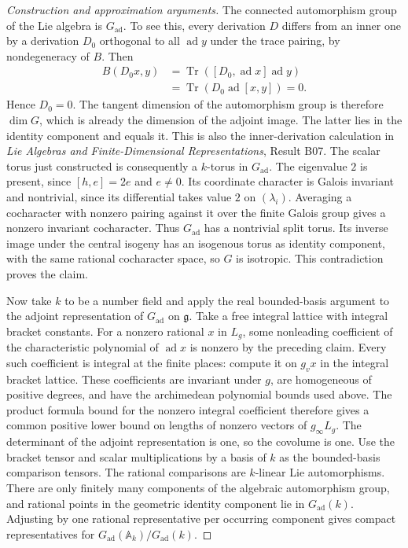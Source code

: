 \documentclass[11pt,a4paper,openany,oneside]{book}
\theoremstyle{resultstyle}
\theoremstyle{definition}
\numberwithin{equation}{chapter}
\begin{document}
\begin{proof}[Construction and approximation arguments]
The connected automorphism group of the Lie
algebra is \(G_{\mathrm{ad}}\). To see this,
every derivation \(D\) differs from an inner one
by a derivation \(D_0\) orthogonal to all
\(\operatorname{ad}y\) under the trace pairing,
by nondegeneracy of \(B\). Then
\[
 \begin{aligned}
 B(D_0x,y)
 &=\operatorname{Tr}([D_0,\operatorname{ad}x]\operatorname{ad}y)\\
 &=\operatorname{Tr}(D_0\operatorname{ad}[x,y])=0 .
 \end{aligned}
\]
Hence \(D_0=0\). The tangent dimension of the
automorphism group is therefore \(\dim G\),
which is already the dimension of the adjoint
image. The latter lies in the identity component
and equals it. This is also the inner-derivation
calculation in \emph{Lie Algebras and Finite-Dimensional
Representations}, Result B07. The scalar torus just constructed
is consequently a \(k\)-torus in \(G_{\mathrm{ad}}\).
The eigenvalue \(2\) is present, since
\([h,e]=2e\) and \(e\ne0\). Its coordinate
character is Galois invariant and nontrivial,
since its differential takes value \(2\) on
\((\lambda_i)\). Averaging a cocharacter with
nonzero pairing against it over the finite
Galois group gives a nonzero invariant
cocharacter. Thus \(G_{\mathrm{ad}}\) has a
nontrivial split torus. Its inverse image under
the central isogeny has an isogenous torus
as identity component, with the same rational
cocharacter space, so \(G\) is isotropic.
This contradiction proves the claim.

Now take \(k\) to be a number field and apply
the real bounded-basis argument to the adjoint
representation of \(G_{\mathrm{ad}}\) on
\(\mathfrak g\). Take a free integral lattice
with integral bracket constants. For a nonzero
rational \(x\) in \(L_g\), some nonleading
coefficient of the characteristic polynomial of
\(\operatorname{ad}x\) is nonzero by the preceding
claim. Every such coefficient is integral at
the finite places: compute it on \(g_vx\)
in the integral bracket lattice. These coefficients
are invariant under \(g\), are homogeneous of
positive degrees, and have the archimedean
polynomial bounds used above. The product
formula bound for the nonzero integral coefficient
therefore gives a common positive lower bound
on lengths of nonzero vectors of \(g_\infty L_g\).
The determinant of the adjoint representation
is one, so the covolume is one. Use the bracket
tensor and scalar multiplications by a basis of
\(k\) as the bounded-basis comparison tensors.
The rational comparisons are \(k\)-linear Lie
automorphisms. There are only finitely many
components of the algebraic automorphism group,
and rational points in the geometric identity
component lie in \(G_{\mathrm{ad}}(k)\).
Adjusting by one rational representative per
occurring component gives compact representatives
for \(G_{\mathrm{ad}}(\mathbb A_k)/G_{\mathrm{ad}}(k)\).


\end{proof}
\end{document}
